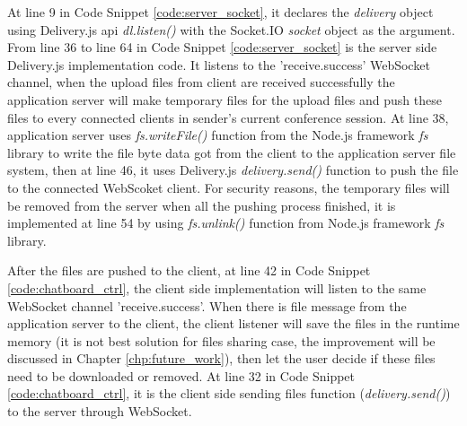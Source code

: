\par At line 9 in Code Snippet \ref{code:server_socket}, it declares the \textit{delivery} object using Delivery.js \gls{api} \textit{dl.listen()} with the Socket.IO \textit{socket} object as the argument. From line 36 to line 64 in Code Snippet \ref{code:server_socket} is the server side Delivery.js implementation code. It listens to the 'receive.success' WebSocket channel, when the upload files from client are received successfully the application server will make temporary files for the upload files and push these files to every connected clients in sender's current conference session. At line 38, application server uses \textit{fs.writeFile()} function from the Node.js framework \textit{fs} library to write the file byte data got from the client to the application server file system, then at line 46, it uses Delivery.js \textit{delivery.send()} function to push the file to the connected WebScoket client. For security reasons, the temporary files will be removed from the server when all the pushing process finished, it is implemented at line 54 by using \textit{fs.unlink()} function from Node.js framework \textit{fs} library.

\par After the files are pushed to the client, at line 42 in Code Snippet \ref{code:chatboard_ctrl}, the client side implementation will listen to the same WebSocket channel 'receive.success'. When there is file message from the application server to the client, the client listener will save the files in the runtime memory (it is not best solution for files sharing case, the improvement will be discussed in Chapter \ref{chp:future_work}), then let the user decide if these files need to be downloaded or removed. At line 32 in Code Snippet \ref{code:chatboard_ctrl}, it is the client side sending files function (\textit{delivery.send()}) to the server through WebSocket.

